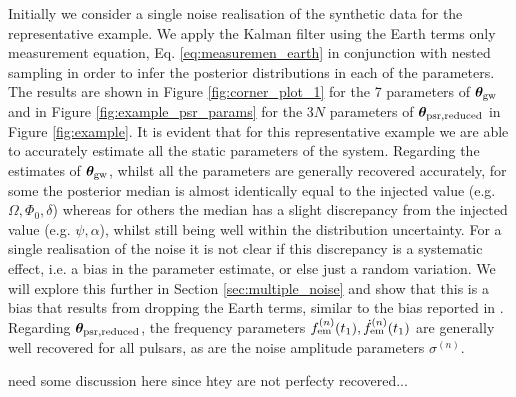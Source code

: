 \documentclass[fleqn,usenatbib,useAMS]{mnras}
\begin{document}
Initially we consider a single noise realisation of the synthetic data for the representative example. We apply the Kalman filter using the Earth terms only measurement equation, Eq. \ref{eq:measuremen_earth} in conjunction with nested sampling in order to infer the posterior distributions in each of the parameters. The results are shown in Figure \ref{fig:corner_plot_1} for the 7 parameters of  $\boldsymbol{\theta}_{\rm gw}$ and in Figure \ref{fig:example_psr_params} for the 3$N$ parameters of $\boldsymbol{\theta}_{\rm psr, reduced}$ in Figure \ref{fig:example}. It is evident that for this representative example we are able to accurately estimate all the static parameters of the system. Regarding the estimates of $\boldsymbol{\theta}_{\rm gw}$, whilst all the parameters are generally recovered accurately, for some the posterior median is almost identically equal to the injected value  (e.g. $\Omega, \Phi_0, \delta$) whereas for others the median has a slight discrepancy from the  injected value (e.g. $\psi, \alpha$), whilst still being well within the distribution uncertainty. For a single realisation of the noise it is not clear if this discrepancy is a systematic effect, i.e. a bias in the parameter estimate, or else just a random variation. We will explore this further in Section \ref{sec:multiple_noise} and show that this is a bias that results from dropping the Earth terms, similar to the bias reported in \cite{Zhupulsarterms}. Regarding $\boldsymbol{\theta}_{\rm psr, reduced}$, the frequency parameters $f_{\rm em}^{(n)}(t_1),\dot{f}_{\rm em}^{(n)}(t_1)$ are generally well recovered for all pulsars, as are the noise amplitude parameters $\sigma^{(n)}$. 

need some discussion here since htey are not perfecty recovered...
\end{document}

